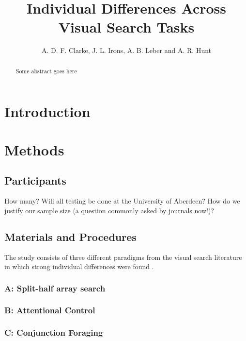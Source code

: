 \documentclass[a4paper, oneside, 11pt, onecolumn]{article}
\begin{document}
\title{Individual Differences Across Visual Search Tasks}

\author{A. D. F. Clarke, J. L. Irons, A. B. Leber and A. R. Hunt}

\maketitle

\begin{abstract}
Some abstract goes here
\end{abstract}

\section{Introduction}


\section{Methods}


\subsection{Participants}
How many? Will all testing be done at the University of Aberdeen? How do we justify our sample size (a question commonly asked by journals now!)?

\subsection{Materials and Procedures}

The study consists of three different paradigms from the visual search literature in which strong individual differences were found \citep{nowakowsak2017, irons-leber2016, kristjansson2014}.
{}
\subsubsection{A: Split-half array search}

\subsubsection{B: Attentional Control}

\subsubsection{C: Conjunction Foraging}
\end{document}
